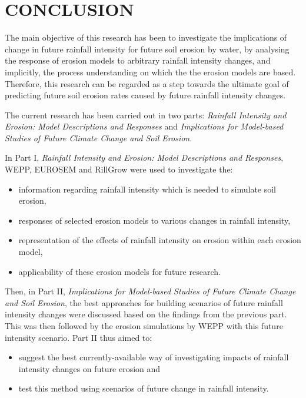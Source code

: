 \chapter{CONCLUSION}
\label{sec:CONCLUSION}

The main objective of this research has been to investigate the implications of
change in future rainfall intensity for future soil erosion by water, by
analysing the response of erosion models to arbitrary rainfall intensity
changes, and implicitly, the process understanding on which the the erosion
models are based. Therefore, this research can be regarded as a step towards the
ultimate goal of predicting future soil erosion rates caused by future rainfall
intensity changes.

The current research has been carried out in two parts: \textit{Rainfall
Intensity and Erosion: Model Descriptions and Responses} and
\textit{Implications for Model-based Studies of Future Climate Change and Soil
Erosion}.

In Part I, \textit{Rainfall Intensity and Erosion: Model Descriptions and
Responses}, WEPP, EUROSEM and RillGrow were used to investigate the:
\begin{itemize}
  \item information regarding rainfall intensity which is needed to simulate
soil erosion,
  \item responses of selected erosion models to various changes in rainfall
intensity,
  \item representation of the effects of rainfall intensity on erosion within
each erosion model,
  \item applicability of these erosion models for future research.
\end{itemize}

Then, in Part II, \textit{Implications for Model-based Studies of Future Climate
Change and Soil Erosion}, the best approaches for building scenarios of future
rainfall intensity changes were discussed based on the findings from the
previous part. This was then followed by the erosion simulations by WEPP
with this future intensity scenario. Part II thus aimed to:
\begin{itemize}
  \item suggest the best currently-available way of investigating impacts of
rainfall intensity changes on future erosion and
  \item test this method using scenarios of future change in rainfall intensity.
\end{itemize}

